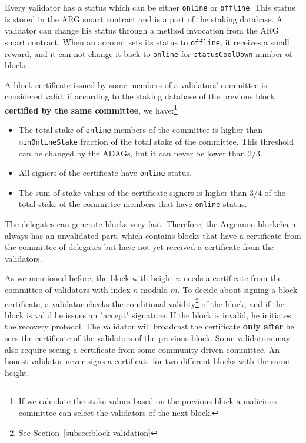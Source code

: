 Every validator has a status which can be either \texttt{online} or \texttt{offline}.
This status is stored in the ARG smart contract and is a part of the staking database. A validator can change
his status through a method invocation
from the ARG smart contract. When an account sets its status to \texttt{offline}, it receives a small reward, and
it can not change it back to \texttt{online} for \texttt{statusCoolDown} number of blocks.


A block certificate issued by some members of a validators' committee is considered valid, if according to
the staking database of the previous block \textbf{certified by the same committee}, we have:\footnote{If we calculate
the stake values based on the previous block a malicious committee can select the validators of the next block.}
\begin{itemize}
    \item The total stake of \texttt{online} members of the committee is higher than \texttt{minOnlineStake} fraction
    of the total stake of the committee. This threshold can be changed by the ADAGs, but it can never be lower
    than $2/3$.
    \item All signers of the certificate have \texttt{online} status.
    \item The sum of stake values of the certificate signers is higher than $3/4$ of the total stake
    of the committee members that have \texttt{online} status.
\end{itemize}

The delegates can generate blocks very fast. Therefore, the Argennon blockchain always has an
unvalidated part, which contains blocks that have a certificate from the committee of delegates but have not
yet received a certificate from the validators.

As we mentioned before, the block with height $n$ needs a certificate from the committee of
validators with index $n$ modulo $m$. To decide about signing a block certificate, a validator
checks the conditional validity\footnote{See Section~\ref{subsec:block-validation}} of the block, and
if the block is valid he issues
an "accept" signature. If the block is invalid, he initiates the recovery protocol. The validator will broadcast the
certificate \textbf{only after} he sees the certificate of the validators of the previous block.
Some validators may also require seeing a certificate from
some community driven committee. An honest validator never signs a certificate for two different blocks with the
same height.

